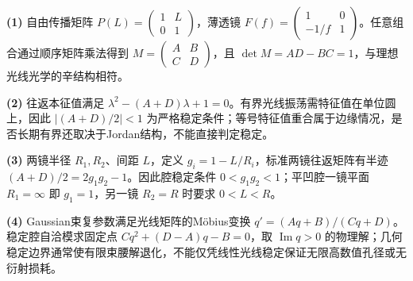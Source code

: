\par\noindent\textbf{(1)} 自由传播矩阵 \(P(L)=\begin{pmatrix}1&L\\0&1\end{pmatrix}\)，薄透镜 \(F(f)=\begin{pmatrix}1&0\\-1/f&1\end{pmatrix}\)。任意组合通过顺序矩阵乘法得到 \(M=\begin{pmatrix}A&B\\C&D\end{pmatrix}\)，且 \(\det M=AD-BC=1\)，与理想光线光学的辛结构相符。
\par\noindent\textbf{(2)} 往返本征值满足 \(\lambda^2-(A+D)\lambda+1=0\)。有界光线振荡需特征值在单位圆上，因此 \(|(A+D)/2|<1\) 为严格稳定条件；等号特征值重合属于边缘情况，是否长期有界还取决于Jordan结构，不能直接判定稳定。
\par\noindent\textbf{(3)} 两镜半径 \(R_1,R_2\)、间距 \(L\)，定义 \(g_i=1-L/R_i\)，标准两镜往返矩阵有半迹 \((A+D)/2=2g_1g_2-1\)。因此腔稳定条件 \(0<g_1g_2<1\)；平凹腔一镜平面 \(R_1=\infty\) 即 \(g_1=1\)，另一镜 \(R_2=R\) 时要求 \(0<L<R\)。
\par\noindent\textbf{(4)} Gaussian束复参数满足光线矩阵的Möbius变换 \(q'=(Aq+B)/(Cq+D)\)。稳定腔自洽模求固定点 \(Cq^2+(D-A)q-B=0\)，取 \(\operatorname{Im}q>0\) 的物理解；几何稳定边界通常使有限束腰解退化，不能仅凭线性光线稳定保证无限高数值孔径或无衍射损耗。
